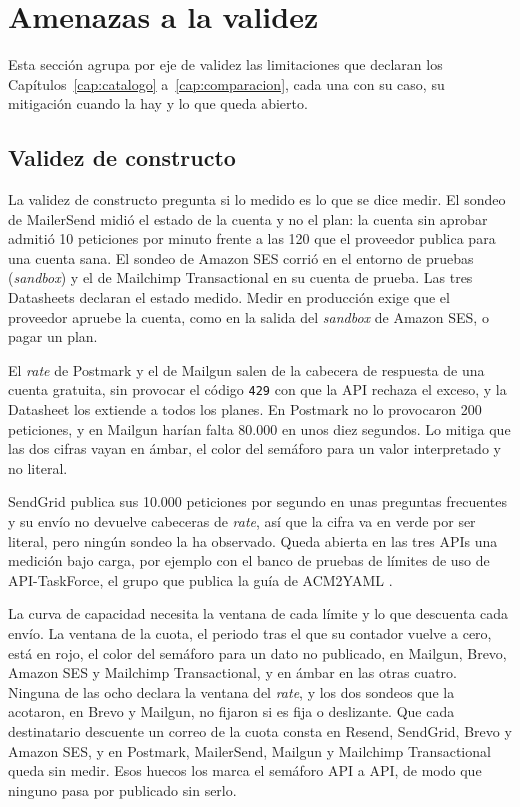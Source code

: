 \section{Amenazas a la validez}\label{sec:conclusiones:amenazas}

Esta sección agrupa por eje de validez las limitaciones que declaran los Capítulos~\ref{cap:catalogo} a~\ref{cap:comparacion}, cada una con su caso, su mitigación cuando la hay y lo que queda abierto.

\subsection{Validez de constructo}\label{sec:conclusiones:constructo}

La validez de constructo pregunta si lo medido es lo que se dice medir.
El sondeo de MailerSend midió el estado de la cuenta y no el plan: la cuenta sin aprobar admitió 10 peticiones por minuto frente a las 120 que el proveedor publica para una cuenta sana.
El sondeo de Amazon SES corrió en el entorno de pruebas (\textit{sandbox}) y el de Mailchimp Transactional en su cuenta de prueba.
Las tres Datasheets declaran el estado medido.
Medir en producción exige que el proveedor apruebe la cuenta, como en la salida del \textit{sandbox} de Amazon SES, o pagar un plan.

El \textit{rate} de Postmark y el de Mailgun salen de la cabecera de respuesta de una cuenta gratuita, sin provocar el código \texttt{429} con que la API rechaza el exceso, y la Datasheet los extiende a todos los planes.
En Postmark no lo provocaron 200 peticiones, y en Mailgun harían falta 80.000 en unos diez segundos.
Lo mitiga que las dos cifras vayan en ámbar, el color del semáforo para un valor interpretado y no literal.

SendGrid publica sus 10.000 peticiones por segundo en unas preguntas frecuentes y su envío no devuelve cabeceras de \textit{rate}, así que la cifra va en verde por ser literal, pero ningún sondeo la ha observado.
Queda abierta en las tres APIs una medición bajo carga, por ejemplo con el banco de pruebas de límites de uso de API-TaskForce, el grupo que publica la guía de ACM2YAML \citep{datasheetusagetesting}.

La curva de capacidad necesita la ventana de cada límite y lo que descuenta cada envío.
La ventana de la cuota, el periodo tras el que su contador vuelve a cero, está en rojo, el color del semáforo para un dato no publicado, en Mailgun, Brevo, Amazon SES y Mailchimp Transactional, y en ámbar en las otras cuatro.
Ninguna de las ocho declara la ventana del \textit{rate}, y los dos sondeos que la acotaron, en Brevo y Mailgun, no fijaron si es fija o deslizante.
Que cada destinatario descuente un correo de la cuota consta en Resend, SendGrid, Brevo y Amazon SES, y en Postmark, MailerSend, Mailgun y Mailchimp Transactional queda sin medir.
Esos huecos los marca el semáforo API a API, de modo que ninguno pasa por publicado sin serlo.

